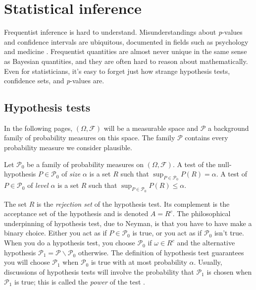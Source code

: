 \section{Statistical inference}

Frequentist inference is hard to understand. Misunderstandings about \textit{p}-values and confidence intervals are ubiquitous, documented in fields such as psychology \parencite{Belia2005-di,Gigerenzer2018-oi} and medicine \parencite{Goodman2008-ed,Gigerenzer2007-qi}. Frequentist quantities are almost never unique in the same sense as Bayesian quantities, and they are often hard to reason about mathematically. Even for statisticians, it's easy to forget just how strange hypothesis tests, confidence
sets, and \textit{p}-values are. 

\subsection{Hypothesis tests}

In the following pages, $(\Omega,\mathcal{\mathcal{F}})$ will be a measurable space and $\mathcal{P}$ a background family of probability measures on this space. The family $\mathcal{P}$ contains every probability measure we consider plausible. 
\begin{definition}
\parencite[][Chapter 3.1]{Lehmann2005-sp} Let $\mathcal{P}_{0}$ be a family of probability measures on $(\Omega,\mathcal{F})$. A test of the null-hypothesis $P\in\mathcal{P}_{0}$ of \emph{size} $\alpha$ is a set $R$ such that $\sup_{P\in\mathcal{P}_{0}}P(R)=\alpha.$ A test of $P\in\mathcal{P}_{0}$ of \emph{level $\alpha$ }is a set $R$ such that $\sup_{P\in\mathcal{P}_{0}}P(R)\leq\alpha.$
\end{definition}

The set $R$ is the \emph{rejection set} of the hypothesis test. Its complement is the acceptance set of the hypothesis and is denoted $A=R^{c}$. The philosophical underpinning of hypothesis test, due to Neyman, is that you have to have make a binary choice. Either you act as if $P\in\mathcal{P}_{0}$ is true, or you act as if $\mathcal{P}_{0}$ isn't true. When you do a hypothesis test, you choose $\mathcal{P}_{0}$ if $\omega\in R^{c}$ and the alternative hypothesis $\mathcal{P}_{1}=\mathcal{P\backslash P}_{0}$ otherwise. The definition of hypothesis test guarantees you will choose $\mathcal{P}_{1}$ when $\mathcal{P}_{0}$ is true with at most probability $\alpha$. Usually, discussions of hypothesis tests will involve the probability that $\mathcal{P}_{1}$ is chosen when $\mathcal{P}_{1}$ is true; this is called the \emph{power} of the test \parencite{Neyman1977-nx}.

